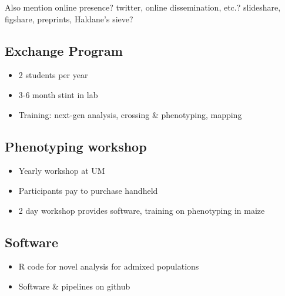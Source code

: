 



\setcounter{section}{1}


Also mention online presence?  twitter, online dissemination, etc.? slideshare, figshare, preprints, Haldane's sieve?

\subsection{Exchange Program} %
\begin{itemize}
\item 2 students per year
\item 3-6 month stint in lab
\item Training: next-gen analysis, crossing \& phenotyping, mapping
\end{itemize}

\subsection{Phenotyping workshop} %
\begin{itemize}
\item Yearly workshop at UM
\item Participants pay to purchase handheld
\item 2 day workshop provides software, training on phenotyping in maize
\end{itemize}

\subsection{Software} %
\begin{itemize}
\item R code for novel analysis for admixed populations
\item Software \& pipelines on github
\end{itemize}

